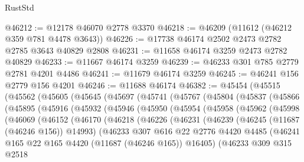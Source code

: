 \begin{lexlean}{RustStd}
\begin{coremodule}
@46212 := @12178 @46070 @2778 @3370
@46218 := @46209 (@11612 (@46212 @359 @781 @4478 @3643))
@46226 := @17738 @46174 @2502 @2473 @2782 @2785 @3643 @40829 @2808
@46231 := @11658 @46174 @3259 @2473 @2782 @40829
@46233 := @11667 @46174 @3259
@46239 := @46233 @301 @785 @2779 @2781 @4201 @4486
@46241 := @11679 @46174 @3259
@46245 := @46241 @156 @2779 @156 @4201
@46246 := @11688 @46174
@46382 := @45454
    (@45515
      (@45562
        (@45605
          (@45645
            (@45697
              (@45741
                (@45767
                  (@45804
                    (@45837
                      (@45866
                        (@45895
                          (@45916
                            (@45932
                              (@45946
                                (@45950
                                  (@45954
                                    (@45958
                                      (@45962
                                        (@45998
                                          (@46069
                                            (@46152
                                              (@46170
                                                (@46218
                                                  (@46226
                                                    (@46231
                                                      (@46239
                                                        (@46245 (@11687 (@46246 @156)) @14993)
                                                        (@46233
                                                          @307
                                                          @616
                                                          @22
                                                          @2776
                                                          @4420
                                                          @4485
                                                          (@46241
                                                            @165
                                                            @22
                                                            @165
                                                            @4420
                                                            (@11687 (@46246 @165))
                                                            @16405)
                                                          (@46233
                                                            @309
                                                            @315
                                                            @2518

\end{coremodule}
\end{lexlean}

